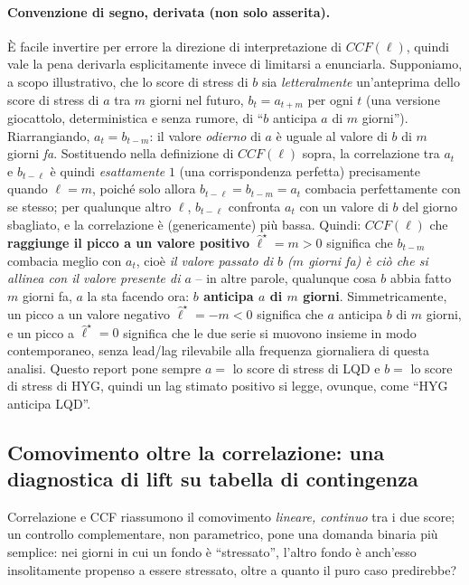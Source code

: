\documentclass[11pt]{article}
\theoremstyle{definition}
\theoremstyle{remark}
\begin{document}
\paragraph{Convenzione di segno, derivata (non solo asserita).} \`E facile invertire per errore la direzione di interpretazione di $CCF(\ell)$, quindi vale la pena derivarla esplicitamente invece di limitarsi a enunciarla. Supponiamo, a scopo illustrativo, che lo score di stress di $b$ sia \emph{letteralmente} un'anteprima dello score di stress di $a$ tra $m$ giorni nel futuro, $b_t = a_{t+m}$ per ogni $t$ (una versione giocattolo, deterministica e senza rumore, di ``$b$ anticipa $a$ di $m$ giorni''). Riarrangiando, $a_t = b_{t-m}$: il valore \emph{odierno} di $a$ \`e uguale al valore di $b$ di $m$ giorni \emph{fa}. Sostituendo nella definizione di $CCF(\ell)$ sopra, la correlazione tra $a_t$ e $b_{t-\ell}$ \`e quindi \emph{esattamente} $1$ (una corrispondenza perfetta) precisamente quando $\ell=m$, poich\'e solo allora $b_{t-\ell}=b_{t-m}=a_t$ combacia perfettamente con se stesso; per qualunque altro $\ell$, $b_{t-\ell}$ confronta $a_t$ con un valore di $b$ del giorno sbagliato, e la correlazione \`e (genericamente) pi\`u bassa. Quindi: $CCF(\ell)$ che \textbf{raggiunge il picco a un valore positivo} $\widehat\ell^\star=m>0$ significa che $b_{t-m}$ combacia meglio con $a_t$, cio\`e \emph{il valore passato di $b$ ($m$ giorni fa) \`e ci\`o che si allinea con il valore presente di $a$} -- in altre parole, qualunque cosa $b$ abbia fatto $m$ giorni fa, $a$ la sta facendo ora: \textbf{$b$ anticipa $a$ di $m$ giorni}. Simmetricamente, un picco a un valore negativo $\widehat\ell^\star=-m<0$ significa che $a$ anticipa $b$ di $m$ giorni, e un picco a $\widehat\ell^\star=0$ significa che le due serie si muovono insieme in modo contemporaneo, senza lead/lag rilevabile alla frequenza giornaliera di questa analisi. Questo report pone sempre $a=$ lo score di stress di LQD e $b=$ lo score di stress di HYG, quindi un lag stimato positivo si legge, ovunque, come ``HYG anticipa LQD''.

\subsection{Comovimento oltre la correlazione: una diagnostica di lift su tabella di contingenza}
\label{sec:lift}

Correlazione e CCF riassumono il comovimento \emph{lineare, continuo} tra i due score; un controllo complementare, non parametrico, pone una domanda binaria pi\`u semplice: nei giorni in cui un fondo \`e ``stressato'', l'altro fondo \`e anch'esso insolitamente propenso a essere stressato, oltre a quanto il puro caso predirebbe?
\end{document}

